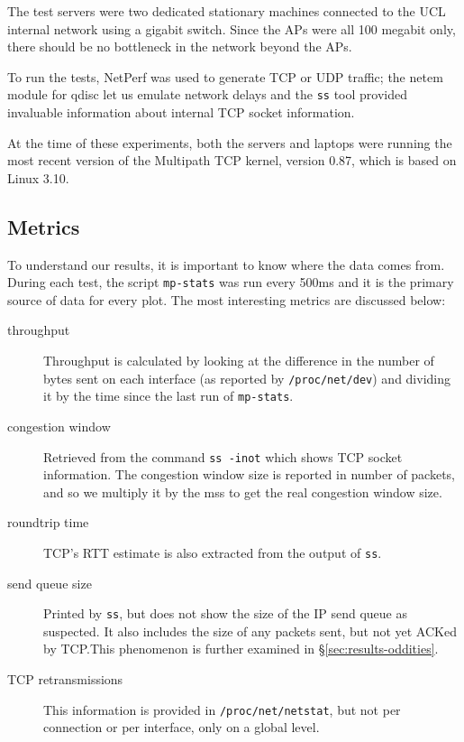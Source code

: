 The test servers were two dedicated stationary machines connected to the UCL
internal network using a gigabit switch. Since the APs were all 100 megabit
only, there should be no bottleneck in the network beyond the APs.

To run the tests, NetPerf was used to generate TCP or UDP traffic; the netem
module for qdisc let us emulate network delays and the \texttt{ss} tool provided
invaluable information about internal TCP socket information.

At the time of these experiments, both the servers and laptops were running the
most recent version of the Multipath TCP kernel, version 0.87, which is based
on Linux 3.10.

\subsection{Metrics}
\label{sec:met:metrics}
To understand our results, it is important to know where the data comes from.
During each test, the script \texttt{mp-stats} was run every 500ms and it is the
primary source of data for every plot. The most interesting metrics are
discussed below:

\begin{description}
  \item[throughput]
    Throughput is calculated by looking at the difference in the number of bytes
    sent on each interface (as reported by \texttt{/proc\-/net/\-dev}) and
    dividing it by the time since the last run of \texttt{mp-stats}.
  \item[congestion window]
    Retrieved from the command \texttt{ss -inot} which shows TCP socket
    information. The congestion window size is reported in number of packets,
    and so we multiply it by the mss to get the real congestion window size.
  \item[roundtrip time]
    TCP's RTT estimate is also extracted from the output of \texttt{ss}.
  \item[send queue size]
    Printed by \texttt{ss}, but does not show the size of the IP send queue as
    suspected. It also includes the size of any packets sent, but not yet ACKed
    by TCP.\@ This phenomenon is further examined in
    \S\ref{sec:results-oddities}.
  \item[TCP retransmissions]
    This information is provided in \texttt{/proc\-/net/\-netstat}, but not per
    connection or per interface, only on a global level.
\end{description}

